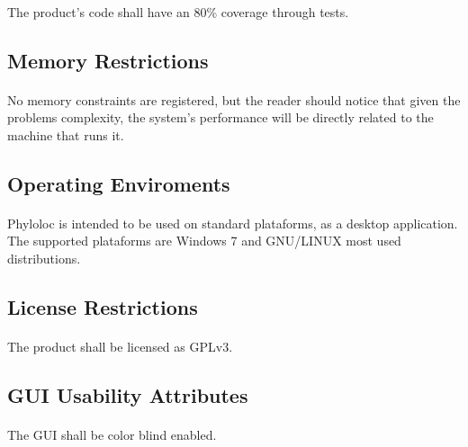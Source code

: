 \documentclass[10pt,a4paper]{article}
\begin{document}
\paragraph{}
The product's code shall have an 80\% coverage through tests.

\subsection{Memory Restrictions}
\paragraph{}
No memory constraints are registered, but the reader should notice that given the problems complexity, the system's performance will be directly related to the machine that runs it.

\subsection{Operating Enviroments}
\paragraph{}
Phyloloc is intended to be used on standard plataforms, as a desktop application. The supported plataforms are Windows 7 and GNU/LINUX most used distributions.

\subsection{License Restrictions}
\paragraph{}
The product shall be licensed as GPLv3.

\subsection{GUI Usability Attributes}
\paragraph{}
The GUI shall be color blind enabled.
\end{document}
